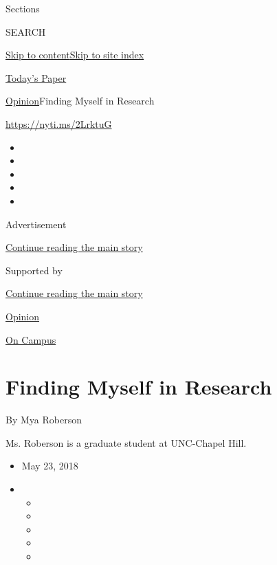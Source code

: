 Sections

SEARCH

\protect\hyperlink{site-content}{Skip to
content}\protect\hyperlink{site-index}{Skip to site index}

\href{https://myaccount.nytimes.com/auth/login?response_type=cookie\&client_id=vi}{}

\href{https://www.nytimes.com/section/todayspaper}{Today's Paper}

\href{/section/opinion}{Opinion}\textbar{}Finding Myself in Research

\href{https://nyti.ms/2LrktuG}{https://nyti.ms/2LrktuG}

\begin{itemize}
\item
\item
\item
\item
\item
\end{itemize}

Advertisement

\protect\hyperlink{after-top}{Continue reading the main story}

Supported by

\protect\hyperlink{after-sponsor}{Continue reading the main story}

\href{/section/opinion}{Opinion}

\href{/column/on-campus}{On Campus}

\hypertarget{finding-myself-in-research}{%
\section{Finding Myself in Research}\label{finding-myself-in-research}}

By Mya Roberson

Ms. Roberson is a graduate student at UNC-Chapel Hill.

\begin{itemize}
\item
  May 23, 2018
\item
  \begin{itemize}
  \item
  \item
  \item
  \item
  \item
  \end{itemize}
\end{itemize}

